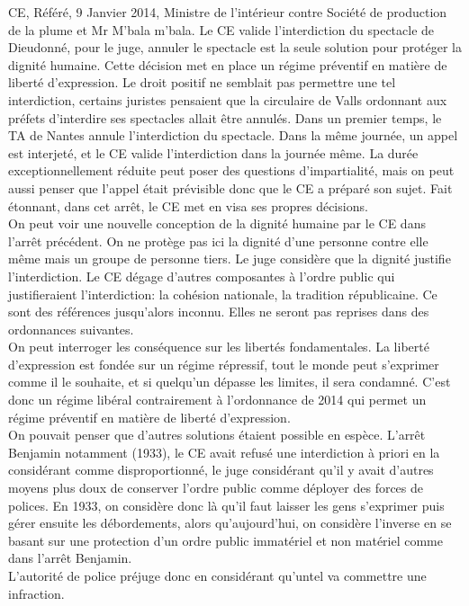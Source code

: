 \documentclass[10pt, a4paper, openany]{book}
\begin{document}
CE, Référé, 9 Janvier 2014, Ministre de l'intérieur contre Société de production de la plume et Mr M'bala m'bala. Le CE valide l'interdiction du spectacle de Dieudonné, pour le juge, annuler le spectacle est la seule solution pour protéger la dignité humaine. Cette décision met en place un régime préventif en matière de liberté d'expression. Le droit positif ne semblait pas permettre une tel interdiction, certains juristes pensaient que la circulaire de Valls ordonnant aux préfets d'interdire ses spectacles allait être annulés. Dans un premier temps, le TA de Nantes annule l'interdiction du spectacle. Dans la même journée, un appel est interjeté, et le CE valide l'interdiction dans la journée même. La durée exceptionnellement réduite peut poser des questions d'impartialité, mais on peut aussi penser que l'appel était prévisible donc que le CE a préparé son sujet. Fait étonnant, dans cet arrêt, le CE met en visa ses propres décisions. \\
On peut voir une nouvelle conception de la dignité humaine par le CE dans l'arrêt précédent. On ne protège pas ici la dignité d'une personne contre elle même mais un groupe de personne tiers. Le juge considère que la dignité justifie l'interdiction. Le CE dégage d'autres composantes à l'ordre public qui justifieraient l'interdiction: la cohésion nationale, la tradition républicaine. Ce sont des références jusqu'alors inconnu. Elles ne seront pas reprises dans des ordonnances suivantes. \\
On peut interroger les conséquence sur les libertés fondamentales. La liberté d'expression est fondée sur un régime répressif, tout le monde peut s'exprimer comme il le souhaite, et si quelqu'un dépasse les limites, il sera condamné. C'est donc un régime libéral contrairement à l'ordonnance de 2014 qui permet un régime préventif en matière de liberté d'expression. \\
On pouvait penser que d'autres solutions étaient possible en espèce. L'arrêt Benjamin notamment (1933), le CE avait refusé une interdiction à priori en la considérant comme disproportionné, le juge considérant qu'il y avait d'autres moyens plus doux de conserver l'ordre public comme déployer des forces de polices. En 1933, on considère donc là qu'il faut laisser les gens s'exprimer puis gérer ensuite les débordements, alors qu'aujourd'hui, on considère l'inverse en se basant sur une protection d'un ordre public immatériel et non matériel comme dans l'arrêt Benjamin. \\
L'autorité de police préjuge donc en considérant qu'untel va commettre une infraction. \\
\end{document}
